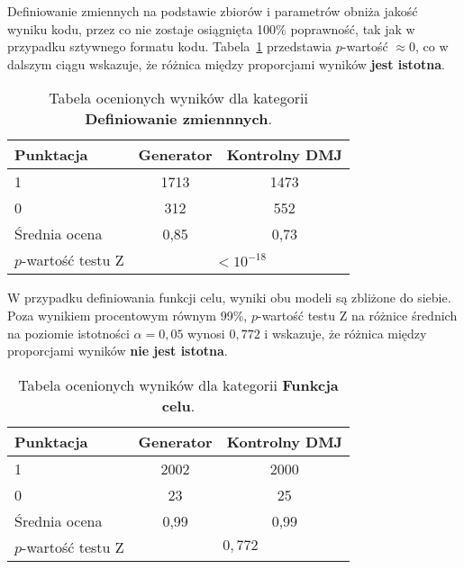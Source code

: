 Definiowanie zmiennych na podstawie zbiorów i parametrów obniża jakość wyniku kodu, przez co nie zostaje osiągnięta 100\% poprawność, tak jak w przypadku sztywnego formatu kodu. Tabela~\ref{tab:tabela19} przedstawia %
$p$-wartość $\approx0$, co w dalszym ciągu wskazuje, że różnica między proporcjami wyników \textbf{jest istotna}.

\begin{table}[H]
\caption{Tabela ocenionych wyników dla kategorii \textbf{Definiowanie zmiennnych}.}\label{tab:tabela19}
\centering%
\begin{tabular}{|l|c|c|}
\hline
\textbf{Punktacja} & \textbf{Generator} & \textbf{Kontrolny DMJ}\\
\hline
1 & 1713 & 1473 \\
\hline
0 & 312 & 552 \\
\hline
Średnia ocena & 0,85 & 0,73 \\
\hline
$p$-wartość testu Z&\multicolumn{2}{c|}{$<10^{-18}$}\\
\hline
\end{tabular}
\end{table}


W przypadku definiowania funkcji celu, wyniki obu modeli są zbliżone do siebie. Poza wynikiem procentowym równym 99\%, %
$p$-wartość testu Z na różnice średnich na poziomie istotności $\alpha=0,05$ wynosi $0,772$
 i wskazuje, że różnica między proporcjami wyników \textbf{nie jest istotna}.

\begin{table}[H]
\caption{Tabela ocenionych wyników dla kategorii \textbf{Funkcja celu}.}\label{tab:tabela20}
\centering%
\begin{tabular}{|l|c|c|}
\hline
\textbf{Punktacja} & \textbf{Generator} & \textbf{Kontrolny DMJ}\\
\hline
1 & 2002 & 2000 \\
\hline
0 & 23 & 25 \\
\hline
Średnia ocena & 0,99 & 0,99 \\
\hline
$p$-wartość testu Z&\multicolumn{2}{c|}{$0,772$}\\
\hline
\end{tabular}
\end{table}


